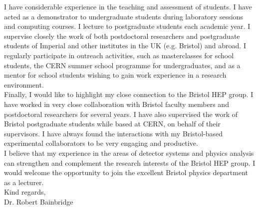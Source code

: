 I have considerable experience in the teaching and assessment of
students. I have acted as a demonstrator to undergraduate students
during laboratory sessions and computing courses. I lecture to
postgraduate students each academic year. I supervise closely the work
of both postdoctoral researchers and postgraduate students of Imperial
and other institutes in the UK (e.g. Bristol) and abroad. I regularly
participate in outreach activities, such as masterclasses for school
students, the CERN summer school programme for undergraduates, and as
a mentor for school students wishing to gain work experience in a
research environment. \\ 

Finally, I would like to highlight my close connection to the Bristol
HEP group. I have worked in very close collaboration with Bristol
faculty members and postdoctoral researchers for several years. I have
also supervised the work of Bristol postgraduate students while based
at CERN, on behalf of their supervisors. I have always found the
interactions with my Bristol-based experimental collaborators to be
very engaging and productive. \\ 

I believe that my experience in the areas of detector systems and
physics analysis can strengthen and complement the research interests
of the Bristol HEP group.  I would welcome the opportunity to join the
excellent Bristol physics department as a lecturer. \\

Kind regards, \\
Dr. Robert Bainbridge





